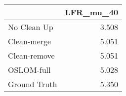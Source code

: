 \begin{tabular}{lr}
\toprule
{} & LFR_mu_40 \\
\midrule
No Clean Up  &     3.508 \\
Clean-merge  &     5.051 \\
Clean-remove &     5.051 \\
OSLOM-full   &     5.028 \\
Ground Truth &     5.350 \\
\bottomrule
\end{tabular}
